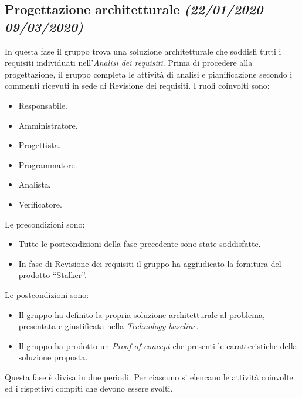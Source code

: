 \documentclass[../piano-di-progetto.tex]{subfiles}
\begin{document}
\subsection[Progettazione architetturale]{Progettazione architetturale {\normalsize\normalfont\itshape(22/01/2020  09/03/2020)}}%
\label{sub:progettazione_architetturale}
In questa fase il gruppo trova una soluzione architetturale che soddisfi tutti i requisiti individuati nell'\textit{Analisi dei requisiti}.
Prima di procedere alla progettazione, il gruppo completa le attività di analisi e pianificazione secondo i commenti ricevuti in sede di Revisione dei requisiti.
I ruoli coinvolti sono:
\begin{itemize}
  \item Responsabile.
  \item Amministratore.
  \item Progettista.
  \item Programmatore.
  \item Analista.
  \item Verificatore.
\end{itemize}
Le precondizioni sono:
\begin{itemize}
  \item Tutte le postcondizioni della fase precedente sono state soddisfatte.
  \item In fase di Revisione dei requisiti il gruppo ha aggiudicato la fornitura del prodotto ``Stalker''.
\end{itemize}
Le postcondizioni sono:
\begin{itemize}
  \item Il gruppo ha definito la propria soluzione architetturale al problema, presentata e giustificata nella \textit{Technology baseline}.
  \item Il gruppo ha prodotto un \textit{Proof of concept} che presenti le caratteristiche della soluzione proposta.
\end{itemize}
Questa fase è divisa in due periodi.
Per ciascuno si elencano le attività coinvolte ed i rispettivi compiti che devono essere svolti.
\end{document}
